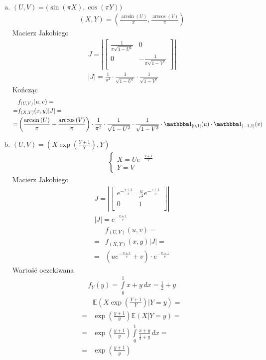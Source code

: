 \begin{enumerate}[a)]
\item $ (U,V) =  \bigl(\sin \left(\pi X\right),\cos\left (\pi Y\right)\bigr) $
\begin{gather*}
(X,Y)=\left(\frac{\arcsin\left(U\right)}{\pi},
\frac{\arccos\left(V\right)}{\pi}\right)
\end{gather*}
Macierz Jakobiego\begin{gather*}
J=\left|\begin{bmatrix}
 \frac{1}{\pi  \sqrt{1-U^2}} & 0 \\
 0 & -\frac{1}{\pi  \sqrt{1-V^2}} \\
\end{bmatrix}\right|\\
\left|J\right|=\frac{1}{\pi ^2 }\cdot\frac{1}{\sqrt{1-U^2}}\cdot \frac{1}{\sqrt{1-V^2}}
\end{gather*}
Kończąc
\begin{align*}
&f_{(U,V)}(u,v)
=\\=&
f_{(X,Y)}(x,y)|J|
=\\=&
\left(\frac{\arcsin\left(U\right)}{\pi}+
\frac{\arccos\left(V\right)}{\pi}\right)\cdot
\frac{1}{\pi ^2 }\cdot\frac{1}{\sqrt{1-U^2}}\cdot \frac{1}{\sqrt{1-V^2}}\cdot
\mathbbm1_{[0,1]}(u)\cdot\mathbbm1_{[-1,1]}(v)
\end{align*}
\item $ (U,V)=\left(X\exp \left(\frac{Y+1}{Y}\right),Y\right) $
\begin{gather*}
\left \{
\begin{array}{l}
X=U e^{-\frac{V+1}{V}}\\
Y=V
\end{array}
\right .
\end{gather*}
Macierz Jakobiego
\begin{gather*}
J=\left|\begin{bmatrix}
 e^{-\frac{v+1}{v}} & \frac{ u}{v^2}e^{-\frac{v+1}{v}} \\
 0 & 1 \\
\end{bmatrix}\right|\\
|J|=e^{-\frac{v+1}{v}}
\end{gather*}
\begin{align*}
&f_{(U,V)}(u,v)
=\\=&
f_{(X,Y)}(x,y)|J|
=\\=&
\left(ue^{-\frac{v+1}{v}}+v\right)\cdot e^{-\frac{v+1}{v}}
\end{align*}
Wartość oczekiwana
\begin{align*}
f_Y(y)=\int\limits_{0}^{1}x+y\,dx
=
\frac{1}{2}+y
\end{align*}
\begin{align*}
&\mathbb E \left(X\exp \left(\frac{Y+1}{Y}\right)|Y=y\right)
=\\=&
\exp \left(\frac{y+1}{y}\right) \mathbb E \left(X|Y=y\right)
=\\=&
\exp \left(\frac{y+1}{y}\right)
\int\limits_{0}^{1}\frac{x+y}{\frac{1}{2}+y}\,dx
=\\=&
\exp \left(\frac{y+1}{y}\right)
\end{align*}
\end{enumerate}



